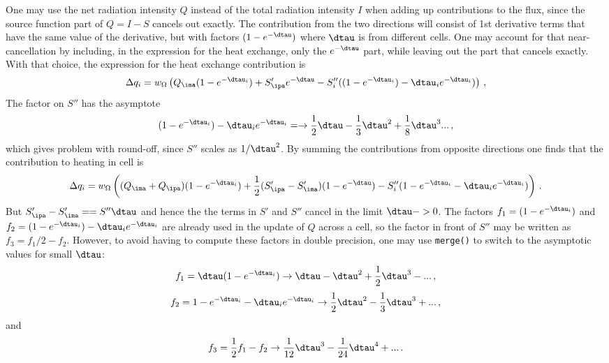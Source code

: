 \documentclass[paper=a4,fontsize=11pt]{scrartcl}
\numberwithin{equation}{section}		%
\numberwithin{figure}{section}			%
\numberwithin{table}{section}				%
\begin{document}
One may use the net radiation intensity $Q$ instead of the total radiation intensity $I$ when adding up contributions to the flux, since the source function part of $Q=I-S$ cancels out exactly.  The contribution from the two directions will consist of 1st derivative terms that have the same value of the derivative, but with factors $(1-e^{-\dtau})$ where $\dtau$ is from different cells. One may account for that near-cancellation by including, in the expression for the heat exchange, only the $e^{-\dtau}$ part, while leaving out the part that cancels exactly.  With that choice, the expression for the heat exchange contribution is
\begin{equation}
    \Delta q_i = w_{\Omega} \left(
    Q_\ima (1-e^{-\dtau_i}) + S'_\ipa e^{-\dtau} - S''_i ((1-e^{-\dtau_i}) - \dtau_i e^{-\dtau_i})
    \right) \,,
\end{equation}
The factor on $S''$ has the asymptote
\begin{equation}
(1-e^{-\dtau_i}) - \dtau_i e^{-\dtau_i} = \rightarrow 
\frac{1}{2}\dtau - \frac{1}{3}\dtau^2 + \frac{1}{8}\dtau^3 ...
\,,
\end{equation}
which gives problem with round-off, since $S''$ scales as $1/\dtau^2$.  By summing the contributions from opposite directions one finds that the contribution to heating in cell is
\begin{equation}
    \Delta q_i = w_{\Omega} \left(
    (Q_\ima+Q_\ipa) (1-e^{-\dtau_i}) + 
    \frac{1}{2}(S'_\ipa-S'_\ima)(1-e^{-\dtau}) - 
    S''_i (1-e^{-\dtau_i}- \dtau_i e^{-\dtau_i})
    \right) \,.
\end{equation}
But $S'_\ipa-S'_\ima==S''\dtau$ and hence the the terms in $S'$ and $S''$ cancel in the limit $\dtau -> 0$. The factors $f_1=(1-e^{-\dtau_i})$ and  $f_2=(1-e^{-\dtau_i}) - \dtau_i e^{-\dtau_i}$ are already used in the update of $Q$ across a cell, so the factor in front of $S''$ may be written as $f_3=f_1/2 -f_2$.  However, to avoid having to compute these factors in double precision, one may use \verb|merge()| to switch to the asymptotic values for small $\dtau$:
\begin{equation}
  f_1 = \dtau(1-e^{-\dtau_i}) \rightarrow \dtau - \dtau^2 + \frac{1}{2}\dtau^3 - ...\,,
\end{equation}
\begin{equation}
  f_2 = 1-e^{-\dtau_i} - \dtau_i e^{-\dtau_i} \rightarrow 
  \frac{1}{2}\dtau^2 - \frac{1}{3}\dtau^3 + ... \,,
\end{equation}
and
\begin{equation}
  f_3 = \frac{1}{2}f_1 -f_2 \rightarrow 
  \frac{1}{12}\dtau^3 - \frac{1}{24} \dtau^4 + ... \,.
\end{equation}
\end{document}
